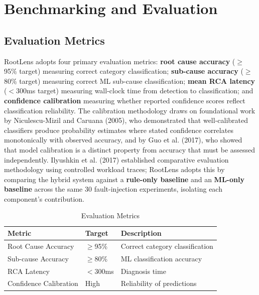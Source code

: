 \section{Benchmarking and Evaluation}

\subsection{Evaluation Metrics}
RootLens adopts four primary evaluation metrics: \textbf{root cause accuracy} ($\geq$95\% target) measuring correct category classification; \textbf{sub-cause accuracy} ($\geq$80\% target) measuring correct ML sub-cause classification; \textbf{mean RCA latency} ($<$300ms target) measuring wall-clock time from detection to classification; and \textbf{confidence calibration} measuring whether reported confidence scores reflect classification reliability. The calibration methodology draws on foundational work by Niculescu-Mizil and Caruana (2005), who demonstrated that well-calibrated classifiers produce probability estimates where stated confidence correlates monotonically with observed accuracy, and by Guo et al. (2017), who showed that model calibration is a distinct property from accuracy that must be assessed independently. Ilyushkin et al. (2017) established comparative evaluation methodology using controlled workload traces; RootLens adopts this by comparing the hybrid system against a \textbf{rule-only baseline} and an \textbf{ML-only baseline} across the same 30 fault-injection experiments, isolating each component's contribution.

\begin{table}[H]
\centering
\begin{tabularx}{\textwidth}{|X|l|X|}
\hline
\textbf{Metric} & \textbf{Target} & \textbf{Description} \\ \hline

Root Cause Accuracy & $\geq$95\% & Correct category classification \\ \hline

Sub-cause Accuracy & $\geq$80\% & ML classification accuracy \\ \hline

RCA Latency & $<$300ms & Diagnosis time \\ \hline

Confidence Calibration & High & Reliability of predictions \\ \hline

\end{tabularx}
\caption{Evaluation Metrics}
\end{table}

